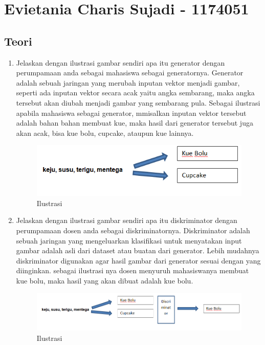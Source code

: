 \section{Evietania Charis Sujadi - 1174051}
\subsection{Teori}

\begin{enumerate}

\item Jelaskan dengan ilustrasi gambar sendiri apa itu generator dengan perumpamaan anda sebagai mahasiswa sebagai generatornya.
Generator adalah sebuah jaringan yang merubah inputan vektor menjadi gambar, seperti ada inputan vektor secara acak yaitu angka sembarang, maka angka tersebut akan diubah menjadi gambar yang sembarang pula. Sebagai ilustrasi apabila mahasiswa sebagai generator, mmisalkan inputan vektor tersebut adalah bahan bahan membuat kue, maka hasil dari generator tersebut juga akan acak, bisa kue bolu, cupcake, ataupun kue lainnya.
\begin{figure}[H]
\centering
\includegraphics[scale=0.4]{figures/1174051/8/1.PNG}
\caption{Ilustrasi}
\label{Contoh}
\end{figure}


\item Jelaskan dengan ilustrasi gambar sendiri apa itu diskriminator dengan perumpamaan dosen anda sebagai diskriminatornya.
Diskriminator adalah sebuah jaringan yang mengeluarkan klasifikasi untuk menyatakan input gambar adalah asli dari dataset atau buatan dari generator. Lebih mudahnya diskriminator digunakan agar hasil gambar dari generator sesuai dengan yang diinginkan. sebagai ilustrasi nya dosen menyuruh mahasiswanya membuat kue bolu, maka hasil yang akan dibuat adalah kue bolu.
\begin{figure}[H]
\centering
\includegraphics[scale=0.4]{figures/1174051/8/2.PNG}
\caption{Ilustrasi}
\label{Contoh}
\end{figure}



\end{enumerate}
